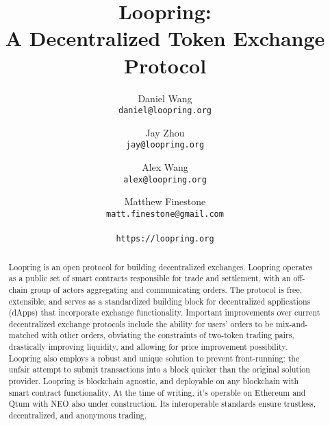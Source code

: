 \documentclass[UTF8,nofonts]{article}
\title{\textbf{Loopring:}\\\textbf{A Decentralized Token Exchange Protocol}}
\author{
  Daniel Wang\\
  \texttt{daniel@loopring.org}\\
  \and
  	Jay Zhou\\
  	\texttt{jay@loopring.org}\\
  	\and
  	Alex Wang\\
  	\texttt{alex@loopring.org}\\
  	\and
  	Matthew Finestone\\
  	\texttt{matt.finestone@gmail.com}\\ 
  \\
  \texttt{https://loopring.org}
 }
\begin{document}
\maketitle


\begin{abstract}
Loopring is an open protocol for building decentralized exchanges. Loopring operates as a public set of smart contracts responsible for trade and settlement, with an off-chain group of actors aggregating and communicating orders. The protocol is free, extensible, and serves as a standardized building block for decentralized applications (dApps) that incorporate exchange functionality. Important improvements over current decentralized exchange protocols include the ability for users' orders to be mix-and-matched with other orders, obviating the constraints of two-token trading pairs, drastically improving liquidity, and allowing for price improvement possibility. Loopring also employs a robust and unique solution to prevent front-running: the unfair attempt to submit transactions into a block quicker than the original solution provider. Loopring is blockchain agnostic, and deployable on any blockchain with smart contract functionality. At the time of writing, it's operable on Ethereum \cite{buterin2017ethereum} \cite{wood2014ethereum} and Qtum \cite{dai2017smart} with NEO \cite{atterlonn2018distributed} also under construction. Its interoperable standards ensure trustless, decentralized, and anonymous trading.
\end{abstract}
\end{document}
